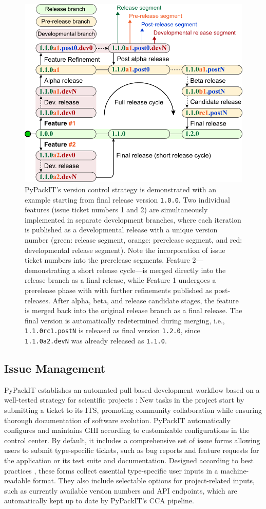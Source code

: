 \documentclass{article}
\begin{document}
\begin{figure}[ht]
    \centering
    \includegraphics[width=0.6\linewidth]{Fig2.pdf}
    \caption{PyPackIT's version control strategy is demonstrated with an example starting from final release version \texttt{1.0.0}. Two individual features (issue ticket numbers 1 and 2) are simultaneously implemented in separate development branches, where each iteration is published as a developmental release with a unique version number (green: release segment, orange: prerelease segment, and red: developmental release segment). Note the incorporation of issue ticket numbers into the prerelease segments. Feature 2—demonstrating a short release cycle—is merged directly into the release branch as a final release, while Feature 1 undergoes a prerelease phase with with further refinements published as post-releases. After alpha, beta, and release candidate stages, the feature is merged back into the original release branch as a final release. The final version is automatically redetermined during merging, i.e., \texttt{1.1.0rc1.postN} is released as final version \texttt{1.2.0}, since \texttt{1.1.0a2.devN} was already released as \texttt{1.1.0}.}
    \label{fig:versioning}
\end{figure}

\subsection{Issue Management}

PyPackIT establishes an automated pull-based development workflow
based on a well-tested strategy for scientific projects \cite{ConfigManageForLargescaleSciComp}: New tasks in the project start by submitting a ticket to its ITS, promoting community collaboration while ensuring thorough documentation of software evolution. PyPackIT automatically configures and maintains GHI according to customizable configurations in the control center. By default, it includes a comprehensive set of issue forms allowing users to submit type-specific tickets, such as bug reports and feature requests for the application or its test suite and documentation. Designed according to best practices \cite{WhatMakesAGoodBugReport, NeedsInBugReports, QualityOfBugReportsInEclipse}, these forms collect essential type-specific user inputs in a machine-readable format. They also include selectable options for project-related inputs, such as currently available version numbers and API endpoints, which are automatically kept up to date by PyPackIT's CCA pipeline.
\end{document}
